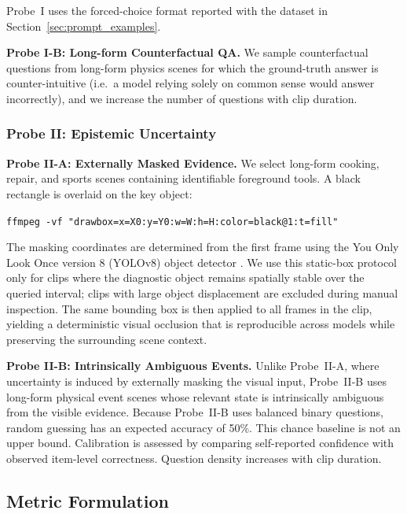 \documentclass[final,5p,times,twocolumn]{elsarticle}
\begin{document}
Probe~I uses the forced-choice format reported with the dataset in
Section~\ref{sec:prompt_examples}.

\noindent\textbf{Probe I-B: Long-form Counterfactual QA.}
We sample counterfactual questions from long-form physics scenes for
which the ground-truth answer is counter-intuitive (i.e.\ a model
relying solely on common sense would answer incorrectly), and we
increase the number of questions with clip duration.

\subsubsection{Probe II: Epistemic Uncertainty}
\label{sec:probe2}

\noindent\textbf{Probe II-A: Externally Masked Evidence.}
We select long-form cooking, repair, and sports scenes containing
identifiable foreground tools. A black rectangle is overlaid on the
key object:
\begin{center}
 \small\texttt{ffmpeg -vf "drawbox=x=X0:y=Y0:w=W:h=H:color=black@1:t=fill"}
\end{center}
The masking coordinates are determined from the first frame using the
You Only Look Once version 8 (YOLOv8) object detector
\cite{jocher2023yolo}. We use this static-box protocol only for clips
where the diagnostic object remains spatially stable over the queried
interval; clips with large object displacement are excluded during
manual inspection. The same bounding box is then applied to all frames
in the clip, yielding a deterministic visual occlusion that is
reproducible across models while preserving the surrounding scene
context.

\noindent\textbf{Probe II-B: Intrinsically Ambiguous Events.}
Unlike Probe~II-A, where uncertainty is induced by externally masking
the visual input, Probe~II-B uses long-form physical event scenes whose
relevant state is intrinsically ambiguous from the visible evidence.
Because Probe~II-B uses balanced binary questions, random guessing has
an expected accuracy of 50\%. This chance baseline is not an upper bound.
Calibration is assessed by comparing self-reported confidence with observed
item-level correctness. Question density increases with clip duration.

\subsection{Metric Formulation}
\label{sec:math}
\end{document}

